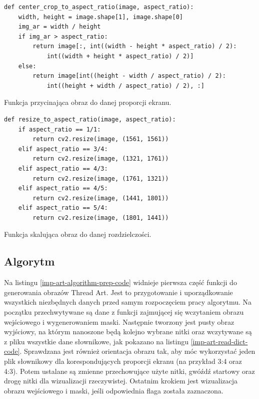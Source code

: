\documentclass[a4paper, 12pt, polish, twoside]{extreport}
\begin{document}
        \begin{code}[H]
        \begin{verbatim}
def center_crop_to_aspect_ratio(image, aspect_ratio):
    width, height = image.shape[1], image.shape[0]
    img_ar = width / height
    if img_ar > aspect_ratio:
        return image[:, int((width - height * aspect_ratio) / 2):
            int((width + height * aspect_ratio) / 2)]
    else:
        return image[int((height - width / aspect_ratio) / 2):
            int((height + width / aspect_ratio) / 2), :]
        \end{verbatim}
        \caption{Funkcja przycinająca obraz do danej proporcji ekranu.}
        \label{imp-art-input-crop-code}
        \end{code}
        
        \begin{code}[H]
        \begin{verbatim}
def resize_to_aspect_ratio(image, aspect_ratio):
    if aspect_ratio == 1/1:
        return cv2.resize(image, (1561, 1561))
    elif aspect_ratio == 3/4:
        return cv2.resize(image, (1321, 1761))
    elif aspect_ratio == 4/3:
        return cv2.resize(image, (1761, 1321))
    elif aspect_ratio == 4/5:
        return cv2.resize(image, (1441, 1801))
    elif aspect_ratio == 5/4:
        return cv2.resize(image, (1801, 1441))
        \end{verbatim}
        \caption{Funkcja skalująca obraz do danej rozdzielczości.}
        \label{imp-art-input-resize-code}
        \end{code}
        
        \subsection{Algorytm} \label{imp-art-alg}
        Na listingu \ref{imp-art-algorithm-prep-code} widnieje pierwsza część funkcji do generowania obrazów Thread Art. Jest to przygotowanie i uporządkowanie wszystkich niezbędnych danych przed samym rozpoczęciem pracy algorytmu. Na początku przechwytywane są dane z funkcji zajmującej się wczytaniem obrazu wejściowego i wygenerowaniem maski. Następnie tworzony jest pusty obraz wyjściowy, na którym nanoszone będą kolejno wybrane nitki oraz wczytywane są z pliku wszystkie dane słownikowe, jak pokazano na listingu \ref{imp-art-read-dict-code}. Sprawdzana jest również orientacja obrazu tak, aby móc wykorzystać jeden plik słownikowy dla korespondujących proporcji ekranu (na przykład 3:4 oraz 4:3). Potem ustalane są zmienne przechowujące użyte nitki, gwóźdź startowy oraz drogę nitki dla wizualizacji rzeczywistej. Ostatnim krokiem jest wizualizacja obrazu wejściowego i maski, jeśli odpowiednia flaga została zaznaczona. 
        
\end{document}
